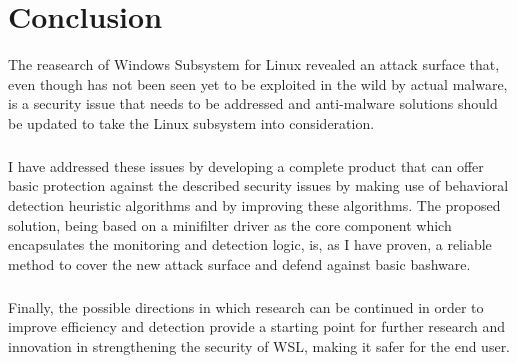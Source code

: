 \chapter{Conclusion}
    The reasearch of Windows Subsystem for Linux revealed an attack surface that, even though has not been seen yet to be exploited in the
    wild by actual malware, is a security issue that needs to be addressed and anti-malware solutions should be updated to take the Linux
    subsystem into consideration.

    \paragraph{}
    I have addressed these issues by developing a complete product that can offer basic protection against the described security issues by
    making use of behavioral detection heuristic algorithms and by improving these algorithms.  The proposed solution, being based on a 
    minifilter driver as the core component which encapsulates the monitoring and detection logic, is, as I have proven, a reliable method
    to cover the new attack surface and defend against basic bashware.

    \paragraph{}
    Finally, the possible directions in which research can be continued in order to improve efficiency and detection provide a starting point
    for further research and innovation in strengthening the security of WSL, making it safer for the end user.